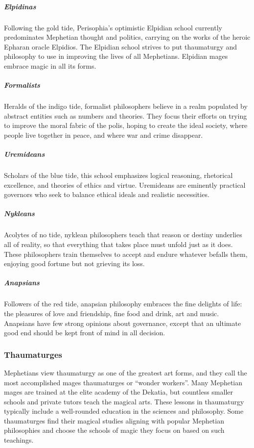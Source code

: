         \subparagraph{Elpidinas} Following the gold tide, Perisophia's optimistic Elpidian school currently predominates Mephetian thought and politics, carrying on the works of the heroic Epharan oracle Elpidios.
        The Elpidian school strives to put thaumaturgy and philosophy to use in improving the lives of all  Mephetians.
        Elpidian mages embrace magic in all its forms.

        \subparagraph{Formalists} Heralds of the indigo tide, formalist philosophers believe in a realm populated by abstract entities such as numbers and theories.
        They focus their efforts on trying to improve the moral fabric of the polis, hoping to create the ideal society, where people live together in peace, and where war and crime disappear.

        \subparagraph{Uremideans} Scholars of the blue tide, this school emphasizes logical reasoning, rhetorical excellence, and theories of ethics and virtue.
        Uremideans are eminently practical governors who seek to balance ethical ideals and realistic necessities.

        \subparagraph{Nykleans} Acolytes of no tide, nyklean philosophers teach that reason or destiny underlies all of reality, so that everything that takes place must unfold just as it does.
        These philosophers train themselves to accept and endure whatever befalls them, enjoying good fortune but not grieving its loss.

        \subparagraph{Anapsians} Followers of the red tide, anapsian philosophy embraces the fine delights of life: the pleasures of love and friendship, fine food and drink, art and music.
        Anapsians have few strong opinions about governance, except that an ultimate good end should be kept front of mind in all decision.

    \subsubsection{Thaumaturges}
        Mephetians view thaumaturgy as one of the greatest art forms, and they call the most accomplished mages thaumaturges or ``wonder workers''.
        Many Mephetian mages are trained at the elite academy of the Dekatia, but countless smaller schools and private tutors teach the magical arts.
        These lessons in thaumaturgy typically include a well-rounded education in the sciences and philosophy.
        Some thaumaturges find their magical studies aligning with popular Mephetian philosophies and choose the schools of magic they focus on based on such teachings.

